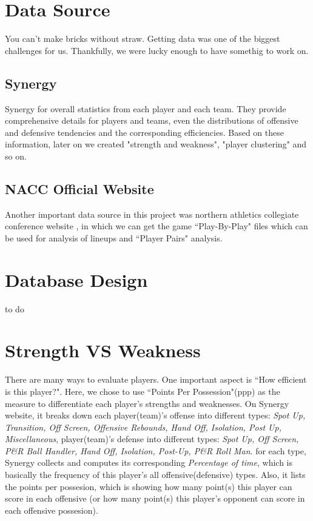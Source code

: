 \documentclass[conference]{IEEEtran}
\begin{document}
\section{Data Source}
You can't make bricks without straw. Getting data was one of the biggest challenges for us. Thankfully, we were lucky enough to have somethig to work on.
\subsection{Synergy} 
Synergy\cite{synergy} for overall statistics from each player and each team. They provide comprehensive details for players and teams, even the distributions of offensive and defensive tendencies and the corresponding efficiencies. Based on these information, later on we created "strength and weakness", "player clustering" and so on.

\subsection{NACC Official Website}
Another important data source in this project was northern athletics collegiate conference website \cite{nacc}, in which we can get the game ``Play-By-Play" files which can be used for analysis of lineups and ``Player Pairs" analysis.

\section{Database Design}
to do\\

\section{Strength VS Weakness}
There are many ways to evaluate players. One important aspect is ``How efficient is this player?". Here, we chose to use ``Points Per Possession"(ppp) as the measure to differentiate each player's strengths and weaknesses. On Synergy website, it breaks down each player(team)'s offense into different types:\textit{ Spot Up, Transition, Off Screen, Offensive Rebounds, Hand Off, Isolation, Post Up, Miscellaneous}, player(team)'s defense into different types:\textit{ Spot Up, Off Screen, P\&R Ball Handler, Hand Off, Isolation, Post-Up, P\&R Roll Man}. for each type, Synergy collects and computes its corresponding \textit{Percentage of time}, which is basically the frequency of this player's all offensive(defensive) types. Also, it lists the points per possesion, which is showing how many point(s) this player can score in each offensive (or how many point(s) this player's opponent can score in each offensive possesion). 
\end{document}
